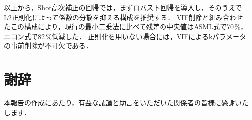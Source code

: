 \documentclass[11pt,a4paper]{ltjsarticle}
\begin{document}
以上から，Shot高次補正の回帰では，まずロバスト回帰を導入し，そのうえでL2正則化によって係数の分散を抑える構成を推奨する．
VIF削除と組み合わせたこの構成により，現行の最小二乗法に比べて残差の中央値はASML式で70\,\%，ニコン式で82\,\%低減した．
正則化を用いない場合には，VIFによるkパラメータの事前削除が不可欠である．

\section*{謝辞}
本報告の作成にあたり，有益な議論と助言をいただいた関係者の皆様に感謝いたします．  %

\clearpage
{}
{}
\end{document}
